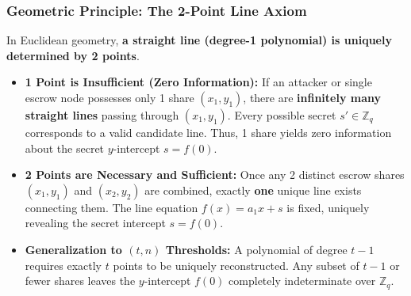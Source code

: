 \documentclass[11pt,a4paper]{article}
\begin{document}
\subsubsection{Geometric Principle: The 2-Point Line Axiom}
In Euclidean geometry, \textbf{a straight line (degree-1 polynomial) is uniquely determined by 2 points}. 
\begin{itemize}
	\item \textbf{1 Point is Insufficient (Zero Information):} If an attacker or single escrow node possesses only 1 share $(x_1, y_1)$, there are \textbf{infinitely many straight lines} passing through $(x_1, y_1)$. Every possible secret $s' \in \mathbb{Z}_q$ corresponds to a valid candidate line. Thus, 1 share yields zero information about the secret $y$-intercept $s = f(0)$.
	\item \textbf{2 Points are Necessary and Sufficient:} Once any 2 distinct escrow shares $(x_1, y_1)$ and $(x_2, y_2)$ are combined, exactly \textbf{one} unique line exists connecting them. The line equation $f(x) = a_1 x + s$ is fixed, uniquely revealing the secret intercept $s = f(0)$.
	\item \textbf{Generalization to $(t,n)$ Thresholds:} A polynomial of degree $t-1$ requires exactly $t$ points to be uniquely reconstructed. Any subset of $t-1$ or fewer shares leaves the $y$-intercept $f(0)$ completely indeterminate over $\mathbb{Z}_q$.
\end{itemize}
\end{document}
